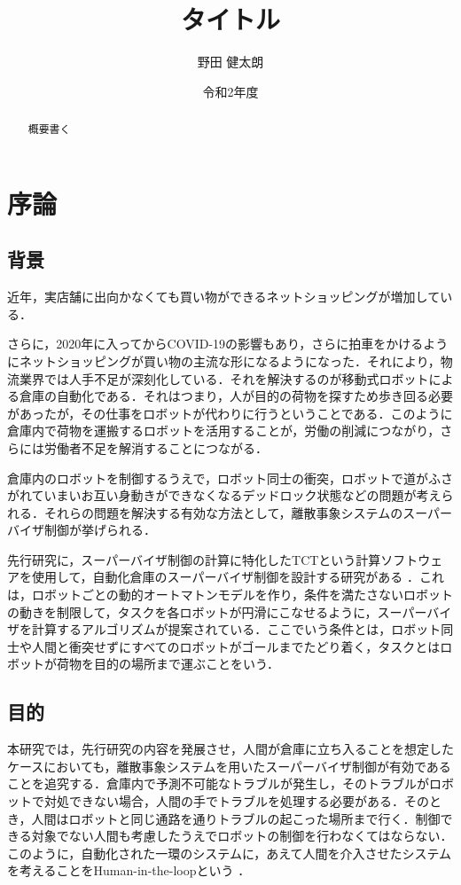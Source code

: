 \documentclass[dvipdfmx]{newthesis}
\title{タイトル}
\date{令和2年度}
\affiliation{
  大阪市立大学 工学部 電気情報工学科 \\
  情報通信領域
}
\author{野田 健太朗}
\begin{document}
\maketitle

\begin{abstract}
概要書く
\end{abstract}
\thesisindex

\chapter{序論}\label{chap:intro}
\section{背景}
近年，実店舗に出向かなくても買い物ができるネットショッピングが増加している．

さらに，2020年に入ってからCOVID-19の影響もあり，さらに拍車をかけるようにネットショッピングが買い物の主流な形になるようになった．それにより，物流業界では人手不足が深刻化している．それを解決するのが移動式ロボットによる倉庫の自動化である．それはつまり，人が目的の荷物を探すため歩き回る必要があったが，その仕事をロボットが代わりに行うということである．このように倉庫内で荷物を運搬するロボットを活用することが，労働の削減につながり，さらには労働者不足を解消することにつながる．

倉庫内のロボットを制御するうえで，ロボット同士の衝突，ロボットで道がふさがれていまいお互い身動きができなくなるデッドロック状態などの問題が考えられる．それらの問題を解決する有効な方法として，離散事象システムのスーパーバイザ制御が挙げられる．%

先行研究に，スーパーバイザ制御の計算に特化したTCTという計算ソフトウェアを使用して，自動化倉庫のスーパーバイザ制御を設計する研究がある%
．これは，ロボットごとの動的オートマトンモデルを作り，条件を満たさないロボットの動きを制限して，タスクを各ロボットが円滑にこなせるように，スーパーバイザを計算するアルゴリズムが提案されている．ここでいう条件とは，ロボット同士や人間と衝突せずにすべてのロボットがゴールまでたどり着く，タスクとはロボットが荷物を目的の場所まで運ぶことをいう．

\section{目的}
本研究では，先行研究の内容を発展させ，人間が倉庫に立ち入ることを想定したケースにおいても，離散事象システムを用いたスーパーバイザ制御が有効であることを追究する．倉庫内で予測不可能なトラブルが発生し，そのトラブルがロボットで対処できない場合，人間の手でトラブルを処理する必要がある．そのとき，人間はロボットと同じ通路を通りトラブルの起こった場所まで行く．制御できる対象でない人間も考慮したうえでロボットの制御を行わなくてはならない．このように，自動化された一環のシステムに，あえて人間を介入させたシステムを考えることをHuman-in-the-loopという%
． 
\end{document}
